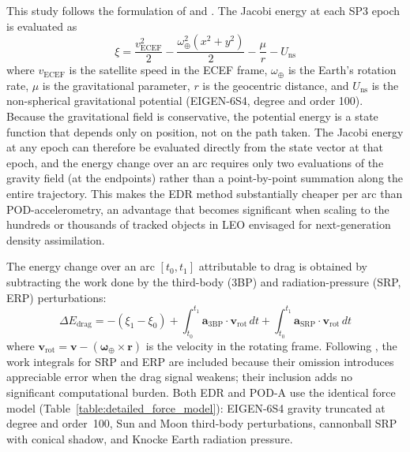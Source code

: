 \documentclass[draft]{agujournal2019}
\begin{document}
This study follows the formulation of
 and .
The Jacobi energy at each SP3 epoch is evaluated as
\begin{equation}
\xi = \frac{v_{\text{ECEF}}^2}{2}
    - \frac{\omega_{\oplus}^2(x^2 + y^2)}{2}
    - \frac{\mu}{r}
    - U_{\text{ns}}
\end{equation}
where $v_{\text{ECEF}}$ is the satellite speed in the ECEF frame,
$\omega_{\oplus}$ is the Earth's rotation rate, $\mu$ is the gravitational
parameter, $r$ is the geocentric distance, and $U_{\text{ns}}$ is the
non-spherical gravitational potential (EIGEN-6S4, degree and order 100).
Because the gravitational field is conservative, the potential energy is a
state function that depends only on position, not on the path taken. The
Jacobi energy at any epoch can therefore be evaluated directly from the
state vector at that epoch, and the energy change over an arc requires only
two evaluations of the gravity field (at the endpoints) rather than a
point-by-point summation along the entire trajectory. This makes the EDR
method substantially cheaper per arc than POD-accelerometry, an advantage
that becomes significant when scaling to the hundreds or thousands of
tracked objects in LEO envisaged for next-generation density assimilation.

The energy change over an arc $[t_0, t_1]$ attributable to drag is obtained
by subtracting the work done by the third-body (3BP) and radiation-pressure
(SRP, ERP) perturbations:
\begin{equation}
\Delta E_{\text{drag}} = -(\xi_1 - \xi_0)
  + \int_{t_0}^{t_1} \mathbf{a}_{\text{3BP}} \cdot \mathbf{v}_{\text{rot}}\, dt
  + \int_{t_0}^{t_1} \mathbf{a}_{\text{SRP}} \cdot \mathbf{v}_{\text{rot}}\, dt
\end{equation}
where $\mathbf{v}_{\text{rot}} = \mathbf{v} -
(\boldsymbol{\omega}_{\oplus} \times \mathbf{r})$ is the velocity in the
rotating frame. Following , the work integrals for
SRP and ERP are included because their omission introduces appreciable error
when the drag signal weakens; their inclusion adds no significant computational
burden. Both EDR and POD-A use the identical force model
(Table~\ref{table:detailed_force_model}): EIGEN-6S4 gravity truncated at
degree and order~100, Sun and Moon third-body perturbations, cannonball SRP
with conical shadow, and Knocke Earth radiation pressure.
\end{document}
